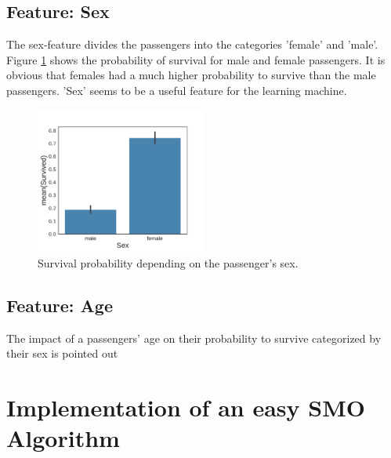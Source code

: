 \subsection{Feature: Sex}
The sex-feature divides the passengers into the categories 'female' and 'male'. Figure \ref{fig:sexfeat} shows the probability of survival for male and female passengers. It is obvious that females had a much higher probability to survive than the male passengers. 'Sex' seems to be a useful feature for the learning machine.
 \begin{figure}
 	\centering
    \includegraphics[width=0.5\textwidth]{media_saved/sex_survived}
  \caption{Survival probability depending on the passenger's sex.}
  \label{fig:sexfeat}
 \end{figure}

\subsection{Feature: Age}
The impact of a passengers' age on their probability to survive categorized by their sex is pointed out 

\section{Implementation of an easy SMO Algorithm}

\printbibliography %
        